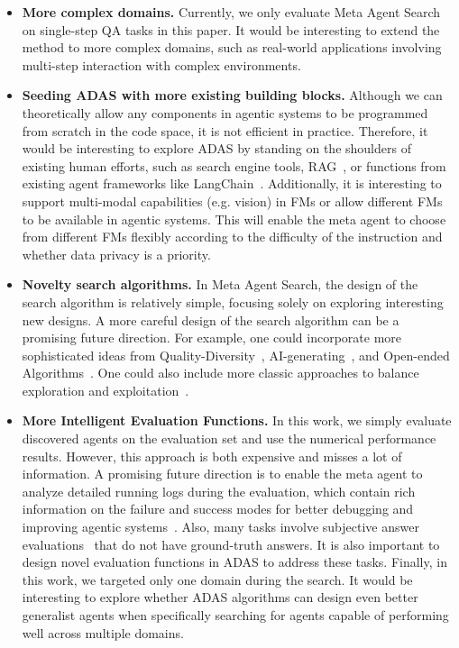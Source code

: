 \documentclass{article} %
\newcommand{\problem}{ADAS\xspace}
\newcommand{\ouralgo}{Meta Agent Search\xspace}
\begin{document}
\begin{itemize}[label=\large\textbullet, left=0pt]
\item \noindent\textbf{More complex domains.}\hspace{0.3em} Currently, we only evaluate \ouralgo on single-step QA tasks in this paper. It would be interesting to extend the method to more complex domains, such as real-world applications involving multi-step interaction with complex environments.

\item \noindent\textbf{Seeding \problem with more existing building blocks.}\hspace{0.3em} Although we can theoretically allow any components in agentic systems to be programmed from scratch in the code space, it is not efficient in practice. Therefore, it would be interesting to explore \problem by standing on the shoulders of existing human efforts, such as search engine tools, RAG~\citep{lewis2020rag}, or functions from existing agent frameworks like LangChain~\citep{langchain}. Additionally, it is interesting to support multi-modal capabilities (e.g. vision) in FMs or allow different FMs to be available in agentic systems. This will enable the meta agent to choose from different FMs flexibly according to the difficulty of the instruction and whether data privacy is a priority.


\item \noindent\textbf{Novelty search algorithms.}\hspace{0.3em}  In \ouralgo, the design of the search algorithm is relatively simple, focusing solely on exploring interesting new designs. A more careful design of the search algorithm can be a promising future direction. For example, one could incorporate more sophisticated ideas from Quality-Diversity~\citep{mouret2015illuminating,cully2017quality}, AI-generating~\citep{clune2019aigas}, and Open-ended Algorithms~\citep{faldor2024omni,zhang2024omni,stanley2015greatness,stanley2019designing}. One could also include more classic approaches to balance exploration and exploitation~\citep{sutton2018reinforcement,liu2024evolution}. 

\item \noindent\textbf{More Intelligent Evaluation Functions.}\hspace{0.3em} In this work, we simply evaluate discovered agents on the evaluation set and use the numerical performance results. However, this approach is both expensive and misses a lot of information. A promising future direction is to enable the meta agent to analyze detailed running logs during the evaluation, which contain rich information on the failure and success modes for better debugging and improving agentic systems~\citep{zhou2024symbolic}. Also, many tasks involve subjective answer evaluations~\citep{chiang2024arena,lu2024aiscientist} that do not have ground-truth answers. It is also important to design novel evaluation functions in \problem to address these tasks. Finally, in this work, we targeted only one domain during the search. It would be interesting to explore whether \problem algorithms can design even better generalist agents when specifically searching for agents capable of performing well across multiple domains.


\end{itemize}
\end{document}
